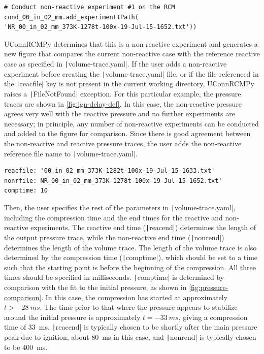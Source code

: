 \documentclass[12pt]{../ussci}
\begin{document}
\begin{verbatim}
# Conduct non-reactive experiment #1 on the RCM
cond_00_in_02_mm.add_experiment(Path(
'NR_00_in_02_mm_373K-1278t-100x-19-Jul-15-1652.txt'))
\end{verbatim}

UConnRCMPy determines that this is a non-reactive experiment and
generates a new figure that compares the current non-reactive case with
the reference reactive case as specified in \texttt|volume-trace.yaml|.
If the user adds a non-reactive experiment before creating the
\texttt|volume-trace.yaml| file, or if the file referenced in the
\texttt|reacfile| key is not present in the current working directory,
UConnRCMPy raises a \texttt|FileNotFound| exception. For this particular
example, the pressure traces are shown in \cref{fig:ign-delay-def}. In this case, the non-reactive
pressure agrees very well with the reactive pressure and no further
experiments are necessary; in principle, any number of non-reactive
experiments can be conducted and added to the figure for comparison.
Since there is good agreement between the non-reactive and reactive
pressure traces, the user adds the non-reactive reference file name to
\texttt|volume-trace.yaml|.

\begin{verbatim}
reacfile: '00_in_02_mm_373K-1282t-100x-19-Jul-15-1633.txt'
nonrfile: NR_00_in_02_mm_373K-1278t-100x-19-Jul-15-1652.txt'
comptime: 10
\end{verbatim}

Then, the user specifies the rest of the parameters in
\texttt|volume-trace.yaml|, including the compression time and the end
times for the reactive and non-reactive experiments. The reactive end
time (\texttt|reacend|) determines the length of the output pressure
trace, while the non-reactive end time (\texttt|nonrend|) determines the
length of the volume trace. The length of the volume trace is also
determined by the compression time (\texttt|comptime|), which should be
set to a time such that the starting point is before the beginning of
the compression. All three times should be specified in milliseconds.
\texttt|comptime| is determined by comparison with the fit to the
initial pressure, as shown in \cref{fig:pressure-comparison}.
In this case, the compression has started at approximately
\(t > \SI{-28}{ms}\). The time prior to that where the pressure
appears to stabilize around the initial pressure is approximately
\(t = \SI{-33}{ms}\), giving a compression time of \SI{33}{\ms}.
\texttt|reacend| is typically chosen to be shortly after the main
pressure peak due to ignition, about \SI{80}{\ms} in this case, and
\texttt|nonrend| is typically chosen to be \SI{400}{\ms}.
\end{document}
